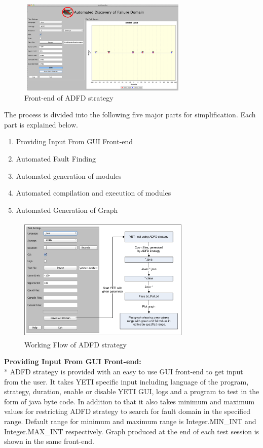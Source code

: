 \documentclass{acm_proc_article-sp}
\begin{document}
\begin{figure}[ht]
\centering
\includegraphics[width=8.2cm,height=4.5cm]{ADFD-front-end.png}
\caption{Front-end of ADFD strategy}
\label{fig:ADFD}
\end{figure}


The process is divided into the following five major parts for simplification. Each part is explained below.

\begin{enumerate}
\item Providing Input From GUI Front-end
\item Automated Fault Finding
\item Automated generation of modules
\item Automated compilation and execution of modules
\item Automated Generation of Graph
\end{enumerate}

\begin{figure}[ht]
\centering
\includegraphics[width=8.2cm,height=6cm]{ADFD-Diagram1.png}
\caption{Working Flow of ADFD strategy}
\label{fig:ADFD}
\end{figure}

\noindent \textbf{Providing Input From GUI Front-end:}\\*
ADFD strategy is provided with an easy to use GUI front-end to get input from the user. It takes YETI specific input including language of the program, strategy, duration, enable or disable YETI GUI, logs and a program to test in the form of java byte code. In addition to that it also takes minimum and maximum values for restricting ADFD strategy to search for fault domain in the specified range. Default range for minimum and maximum range is Integer.MIN\_INT and Integer.MAX\_INT respectively. Graph produced at the end of each test session is shown in the same front-end.
\end{document}
